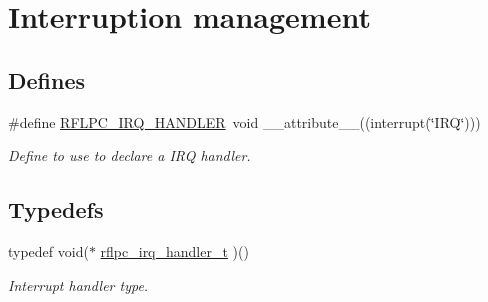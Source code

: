 \hypertarget{group__irq}{\section{Interruption management}
\label{group__irq}
}
\subsection*{Defines}
\begin{DoxyCompactItemize}
\item 
\hypertarget{group__irq_ga1aece79f01da0cb3da00eff5fd3adb6c}{\#define \hyperlink{group__irq_ga1aece79f01da0cb3da00eff5fd3adb6c}{R\-F\-L\-P\-C\-\_\-\-I\-R\-Q\-\_\-\-H\-A\-N\-D\-L\-E\-R}~void \-\_\-\-\_\-attribute\-\_\-\-\_\-((interrupt(\char`\"{}I\-R\-Q\char`\"{})))}\label{group__irq_ga1aece79f01da0cb3da00eff5fd3adb6c}

\begin{DoxyCompactList}\small\item\em Define to use to declare a I\-R\-Q handler. \end{DoxyCompactList}\end{DoxyCompactItemize}
\subsection*{Typedefs}
\begin{DoxyCompactItemize}
\item 
\hypertarget{group__irq_ga4970a8a2cf9b63e4c261982504669a1f}{typedef void($\ast$ \hyperlink{group__irq_ga4970a8a2cf9b63e4c261982504669a1f}{rflpc\-\_\-irq\-\_\-handler\-\_\-t} )()}\label{group__irq_ga4970a8a2cf9b63e4c261982504669a1f}

\begin{DoxyCompactList}\small\item\em Interrupt handler type. \end{DoxyCompactList}\end{DoxyCompactItemize}

